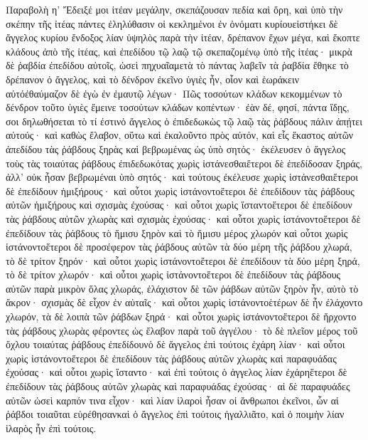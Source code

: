 Παραβολὴ η’
Ἔδειξέ μοι ἰτέαν μεγάλην, σκεπάζουσαν πεδία καὶ ὄρη, καὶ ὑπὸ τὴν σκέπην τῆς ἰτέας πάντες ἐληλύθασιν οἱ κεκλημένοι ἐν ὀνόματι κυρίουεἱστήκει δὲ ἄγγελος κυρίου ἔνδοξος λίαν ὑψηλὸς παρὰ τὴν ἰτέαν, δρέπανον ἔχων μέγα, καὶ ἔκοπτε κλάδους ἀπὸ τῆς ἰτέας, καὶ ἐπεδίδου τῷ λαῷ τῷ σκεπαζομένῳ ὑπὸ τῆς ἰτέας· μικρὰ δὲ ῥαβδία ἐπεδίδου αὐτοῖς, ὡσεὶ πηχυαῖαμετὰ τὸ πάντας λαβεῖν τὰ ῥαβδία ἔθηκε τὸ δρέπανον ὁ ἄγγελος, καὶ τὸ δένδρον ἐκεῖνο ὑγιὲς ἦν, οἷον καὶ ἑωράκειν αὐτόἐθαύμαζον δὲ ἐγὼ ἐν ἐμαυτῷ λέγων· Πῶς τοσούτων κλάδων κεκομμένων τὸ δένδρον τοῦτο ὑγιὲς ἔμεινε τοσούτων κλάδων κοπέντων· ἐὰν δέ, φησί, πάντα ἴδῃς, σοι δηλωθήσεται τὸ τί ἐστινὁ ἄγγελος ὁ ἐπιδεδωκὼς τῷ λαῷ τὰς ῥάβδους πάλιν ἀπῄτει αὐτούς· καὶ καθὼς ἔλαβον, οὕτω καὶ ἐκαλοῦντο πρὸς αὐτόν, καὶ εἷς ἕκαστος αὐτῶν ἀπεδίδου τὰς ῥάβδους ξηρὰς καὶ βεβρωμένας ὡς ὑπὸ σητός· ἐκέλευσεν ὁ ἄγγελος τοὺς τὰς τοιαύτας ῥάβδους ἐπιδεδωκότας χωρὶς ἱστάνεσθαιἕτεροι δὲ ἐπεδίδοσαν ξηράς, ἀλλ’ οὐκ ἦσαν βεβρωμέναι ὑπὸ σητός· καὶ τούτους ἐκέλευσε χωρὶς ἱστάνεσθαιἕτεροι δὲ ἐπεδίδουν ἡμιξήρους· καὶ οὗτοι χωρὶς ἱστάνοντοἕτεροι δὲ ἐπεδίδουν τὰς ῥάβδους αὐτῶν ἡμιξήρους καὶ σχισμὰς ἐχούσας· καὶ οὗτοι χωρὶς ἵσταντοἕτεροι δὲ ἐπεδίδουν τὰς ῥάβδους αὐτῶν χλωρὰς καὶ σχισμὰς ἐχούσας· καὶ οὗτοι χωρὶς ἱστάνοντοἕτεροι δὲ ἐπεδίδουν τὰς ῥάβδους τὸ ἥμισυ ξηρὸν καὶ τὸ ἥμισυ μέρος χλωρόν καὶ οὗτοι χωρὶς ἱστάνοντοἕτεροι δὲ προσέφερον τὰς ῥάβδους αὐτῶν τὰ δύο μέρη τῆς ῥάβδου χλωρά, τὸ δὲ τρίτον ξηρόν· καὶ οὗτοι χωρὶς ἱστάνοντοἕτεροι δὲ ἐπεδίδουν τὰ δύο μέρη ξηρά, τὸ δὲ τρίτον χλωρόν· καὶ οὗτοι χωρὶς ἱστάνοντοἕτεροι δὲ ἐπεδίδουν τὰς ῥάβδους αὐτῶν παρὰ μικρὸν ὅλας χλωράς, ἐλάχιστον δὲ τῶν ῥάβδων αὐτῶν ξηρὸν ἦν, αὐτὸ τὸ ἄκρον· σχισμὰς δὲ εἶχον ἐν αὐταῖς· καὶ οὗτοι χωρὶς ἱστάνοντοἑτέρων δὲ ἦν ἐλάχοντο χλωρόν, τὰ δὲ λοιπὰ τῶν ῥάβδων ξηρά· καὶ οὗτοι χωρὶς ἱστάνοντοἕτεροι δὲ ἤρχοντο τὰς ῥάβδους χλωρὰς φέροντες ὡς ἔλαβον παρὰ τοῦ ἀγγέλου· τὸ δὲ πλεῖον μέρος τοῦ ὄχλου τοιαύτας ῥάβδους ἐπεδίδουνὁ δὲ ἄγγελος ἐπὶ τούτοις ἐχάρη λίαν· καὶ οὗτοι χωρὶς ἱστάνοντοἕτεροι δὲ ἐπεδίδουν τὰς ῥάβδους αὐτῶν χλωρὰς καὶ παραφυάδας ἐχούσας· καὶ οὗτοι χωρὶς ἵσταντο· καὶ ἐπὶ τούτοις ὁ ἀγγελος λίαν ἐχάρηἕτεροι δὲ ἐπεδίδουν τὰς ῥάβδους αὐτῶν χλωρὰς καὶ παραφυάδας ἐχούσας· αἱ δὲ παραφυάδες αὐτῶν ὡσεὶ καρπόν τινα εἶχον· καὶ λίαν ἱλαροὶ ἦσαν οἱ ἄνθρωποι ἐκεῖνοι, ὧν αἱ ῥάβδοι τοιαῦται εὑρέθησανκαὶ ὁ ἄγγελος ἐπὶ τούτοις ἠγαλλιᾶτο, καὶ ὁ ποιμὴν λίαν ἱλαρὸς ἦν ἐπὶ τούτοις.
